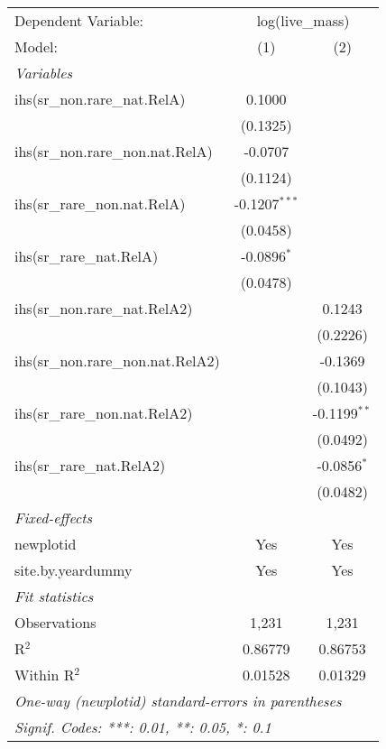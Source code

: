 \begin{tabular}{lcc}
\tabularnewline\midrule\midrule
Dependent Variable:&\multicolumn{2}{c}{log(live\_mass)}\\
Model:&(1) & (2)\\
\midrule \emph{Variables}&   &  \\
ihs(sr\_non.rare\_nat.RelA)&0.1000 &   \\
  &(0.1325) &   \\
ihs(sr\_non.rare\_non.nat.RelA)&-0.0707 &   \\
  &(0.1124) &   \\
ihs(sr\_rare\_non.nat.RelA)&-0.1207$^{***}$ &   \\
  &(0.0458) &   \\
ihs(sr\_rare\_nat.RelA)&-0.0896$^{*}$ &   \\
  &(0.0478) &   \\
ihs(sr\_non.rare\_nat.RelA2)&   & 0.1243\\
  &   & (0.2226)\\
ihs(sr\_non.rare\_non.nat.RelA2)&   & -0.1369\\
  &   & (0.1043)\\
ihs(sr\_rare\_non.nat.RelA2)&   & -0.1199$^{**}$\\
  &   & (0.0492)\\
ihs(sr\_rare\_nat.RelA2)&   & -0.0856$^{*}$\\
  &   & (0.0482)\\
\midrule \emph{Fixed-effects}&   &  \\
newplotid & Yes & Yes\\
site.by.yeardummy & Yes & Yes\\
\midrule \emph{Fit statistics}&  & \\
Observations & 1,231&1,231\\
R$^2$ & 0.86779&0.86753\\
Within R$^2$ & 0.01528&0.01329\\
\midrule\midrule\multicolumn{3}{l}{\emph{One-way (newplotid) standard-errors in parentheses}}\\
\multicolumn{3}{l}{\emph{Signif. Codes: ***: 0.01, **: 0.05, *: 0.1}}\\
\end{tabular}


